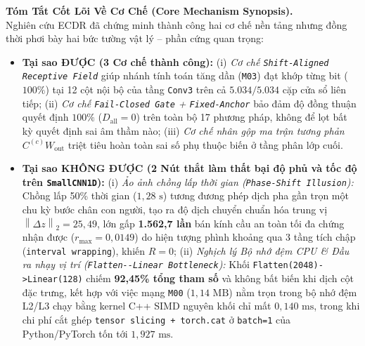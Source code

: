 \documentclass[11pt,a4paper]{article}
\newcommand{\norm}[1]{\left\lVert #1\right\rVert}
\newcommand{\code}[1]{{\small\ttfamily\nolinkurl{#1}}}
\begin{document}
\begin{titlepage}
\vspace{0.45cm}
\noindent\colorbox{pale}{%
\parbox{\dimexpr\linewidth-2\fboxsep}{%
\textbf{\color{ink}Tóm Tắt Cốt Lõi Về Cơ Chế (Core Mechanism Synopsis).}\\[4pt]
Nghiên cứu ECDR đã chứng minh thành công hai cơ chế nền tảng nhưng đồng thời phơi bày hai bức tường vật lý -- phần cứng quan trọng:
\begin{itemize}[leftmargin=1.4em]
  \item \textbf{Tại sao ĐƯỢC (3 Cơ chế thành công):}
    (i) \textit{Cơ chế \code{Shift-Aligned Receptive Field}} giúp nhánh tính toán tăng dần (\code{M03}) đạt khớp từng bit ($100\%$) tại 12 cột nội bộ của tầng \code{Conv3} trên cả $5.034/5.034$ cặp cửa sổ liên tiếp;
    (ii) \textit{Cơ chế \code{Fail-Closed Gate} + \code{Fixed-Anchor}} bảo đảm độ đồng thuận quyết định $100\%$ ($D_{\text{all}} = 0$) trên toàn bộ 17 phương pháp, không để lọt bất kỳ quyết định sai âm thầm nào;
    (iii) \textit{Cơ chế nhân gộp ma trận tương phản $C^{(c)} W_{\text{out}}$} triệt tiêu hoàn toàn sai số phụ thuộc biến ở tầng phân lớp cuối.
  \item \textbf{Tại sao KHÔNG ĐƯỢC (2 Nút thắt làm thất bại độ phủ và tốc độ trên \code{SmallCNN1D}):}
    (i) \textit{Ảo ảnh chồng lấp thời gian (\code{Phase-Shift Illusion}):} Chồng lấp 50\% thời gian ($1,28\text{ s}$) tương đương phép dịch pha gần trọn một chu kỳ bước chân con người, tạo ra độ dịch chuyển chuẩn hóa trung vị $\norm{\Delta z}_2 = 25,49$, lớn gấp \textbf{1.562,7 lần} bán kính cầu an toàn tối đa chứng nhận được ($r_{\max} = 0,0149$) do hiện tượng phình khoảng qua 3 tầng tích chập (\code{interval wrapping}), khiến $R = 0$;
    (ii) \textit{Nghịch lý Bộ nhớ đệm CPU \& Đầu ra nhạy vị trí (\code{Flatten--Linear Bottleneck}):} Khối \code{Flatten(2048)->Linear(128)} chiếm \textbf{92,45\% tổng tham số} và không bất biến khi dịch cột đặc trưng, kết hợp với việc mạng \code{M00} ($1,14\text{ MB}$) nằm trọn trong bộ nhớ đệm L2/L3 chạy bằng kernel C++ SIMD nguyên khối chỉ mất $0,140\text{ ms}$, trong khi chi phí cắt ghép \code{tensor slicing + torch.cat} ở \code{batch=1} của Python/PyTorch tốn tới $1,927\text{ ms}$.
\end{itemize}
}}
\vfill
\end{titlepage}
\hypersetup{pageanchor=true}

\begingroup\small\setlength{\parskip}{1pt}\tableofcontents\endgroup
\clearpage

\end{document}
